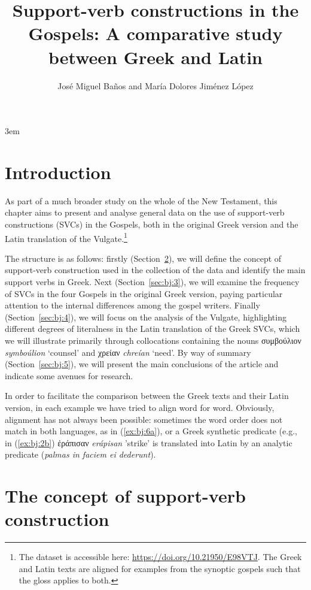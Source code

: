 \documentclass[output=paper,colorlinks,citecolor=brown]{langscibook}
\author{José Miguel Baños\affiliation{Universidad Complutense         de Madrid} and         María Dolores Jiménez López\affiliation{Universidad de           Alcalá de Henares}}
\title[Support-verb constructions in the Gospels]{Support-verb constructions in the Gospels: A comparative study between Greek and Latin}
\begin{document}
\emergencystretch 3em
\maketitle

\section{Introduction}\label{sec:bj:1}


As part of a much broader study on the whole of the New Testament, this chapter
aims to present and analyse general data on the use of support-verb constructions (SVCs)
in the Gospels, both in the original Greek version and the Latin translation of the
Vulgate.\footnote{The dataset is accessible here: \url{https://doi.org/10.21950/E98VTJ}. The Greek and Latin texts are aligned for examples from the synoptic gospels such that the gloss applies to both.}

The structure is as follows: firstly (Section~\ref{sec:bj:2}), we will define the concept of
support-verb construction used in the collection of the data and identify the main
support verbs in Greek. Next (Section~\ref{sec:bj:3}), we will examine the frequency of SVCs in
the four Gospels in the original Greek version, paying particular attention to the
internal differences among the gospel writers. Finally (Section~\ref{sec:bj:4}), we will focus
on the analysis of the Vulgate, highlighting different degrees of literalness in the Latin
translation of the Greek SVCs, which we will illustrate primarily through collocations
containing the nouns συμβούλιον \emph{symboúlion} `counsel' and χρείαν \emph{chreían}
`need'. By way of summary (Section~\ref{sec:bj:5}), we will present the main
conclusions of the article and indicate some avenues for research.

In order to facilitate the comparison between the Greek texts and their Latin version, in each example we have tried to align word for word. Obviously, alignment has not always been possible: sometimes the word order does not match in both languages, as in (\ref{ex:bj:6a}), or a Greek synthetic predicate (e.g., in (\ref{ex:bj:2b}) ἐράπισαν \textit{erápisan} 'strike' is translated into Latin by an analytic predicate (\textit{palmas in faciem ei dederunt}).


\section{The concept of support-verb construction}\label{sec:bj:2}
\end{document}
